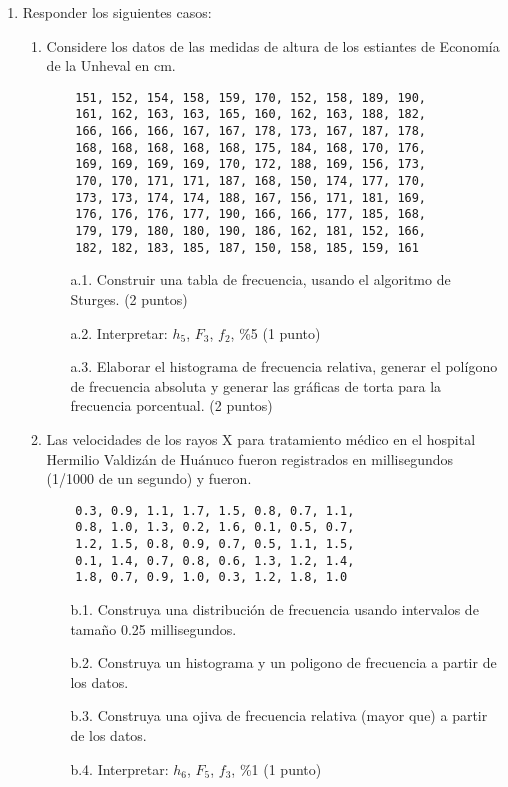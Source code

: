 \documentclass{article}
\begin{document}
\begin{enumerate}
    \item Responder los siguientes casos:
    \begin{enumerate}
        \item Considere los datos de las medidas de altura de los estiantes de Economía de la Unheval en cm.
        
        \begin{verbatim}
    151, 152, 154, 158, 159, 170, 152, 158, 189, 190,
    161, 162, 163, 163, 165, 160, 162, 163, 188, 182,
    166, 166, 166, 167, 167, 178, 173, 167, 187, 178,
    168, 168, 168, 168, 168, 175, 184, 168, 170, 176,
    169, 169, 169, 169, 170, 172, 188, 169, 156, 173,
    170, 170, 171, 171, 187, 168, 150, 174, 177, 170,
    173, 173, 174, 174, 188, 167, 156, 171, 181, 169,
    176, 176, 176, 177, 190, 166, 166, 177, 185, 168,
    179, 179, 180, 180, 190, 186, 162, 181, 152, 166,
    182, 182, 183, 185, 187, 150, 158, 185, 159, 161
        \end{verbatim}
        
        \begin{itemize}
            \item[a.1.] Construir una tabla de frecuencia, usando el algoritmo de Sturges. (2 puntos)
            \item[a.2.] Interpretar: $h_5$, $F_3$, $f_2$, \%5 (1 punto)
            \item[a.3.] Elaborar el histograma de frecuencia relativa, generar el polígono de frecuencia absoluta y generar las gráficas de torta para la frecuencia porcentual. (2 puntos)
        \end{itemize}
        
        \item Las velocidades de los rayos X para tratamiento médico en el hospital Hermilio Valdizán de Huánuco fueron registrados en millisegundos (1/1000 de un segundo) y fueron.
        
        \begin{verbatim}
    0.3, 0.9, 1.1, 1.7, 1.5, 0.8, 0.7, 1.1,
    0.8, 1.0, 1.3, 0.2, 1.6, 0.1, 0.5, 0.7,
    1.2, 1.5, 0.8, 0.9, 0.7, 0.5, 1.1, 1.5,
    0.1, 1.4, 0.7, 0.8, 0.6, 1.3, 1.2, 1.4,
    1.8, 0.7, 0.9, 1.0, 0.3, 1.2, 1.8, 1.0
        \end{verbatim}
        
        \begin{itemize}
            \item[b.1.] Construya una distribución de frecuencia usando intervalos de tamaño 0.25 millisegundos.
            \item[b.2.] Construya un histograma y un poligono de frecuencia a partir de los datos.
            \item[b.3.] Construya una ojiva de frecuencia relativa (mayor que) a partir de los datos.
            \item[b.4.] Interpretar: $h_6$, $F_5$, $f_3$, \%1 (1 punto) 
        \end{itemize}
    \end{enumerate}
\end{enumerate}
\end{document}
